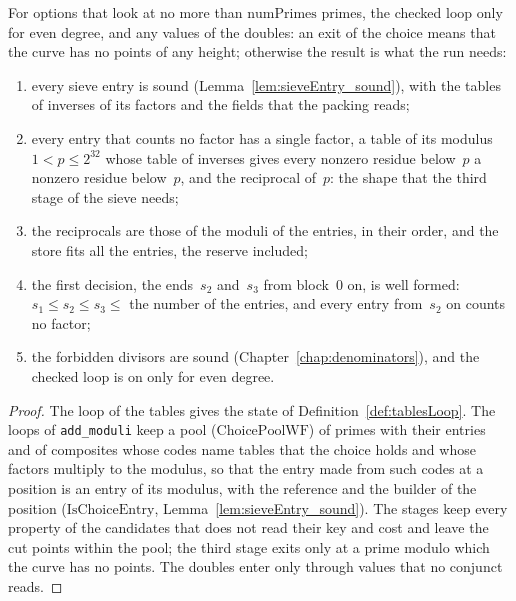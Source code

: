 \begin{lemma}\label{lem:choiceOfModuli}
  \leanok
  For options that look at no more than $\mathrm{numPrimes}$ primes, the checked loop only for even
  degree, and any values of the doubles: an exit of the choice means that the curve has no points
  of any height; otherwise the result is what the run needs:
  \begin{enumerate}
    \item every sieve entry is sound (Lemma~\ref{lem:sieveEntry_sound}), with the tables of
      inverses of its factors and the fields that the packing reads;
    \item every entry that counts no factor has a single factor, a table of its modulus
      $1 < p \le 2^{32}$ whose table of inverses gives every nonzero residue below~$p$ a nonzero
      residue below~$p$, and the reciprocal of~$p$: the shape that the third stage of the sieve
      needs;
    \item the reciprocals are those of the moduli of the entries, in their order, and the store
      fits all the entries, the reserve included;
    \item the first decision, the ends~$s_2$ and~$s_3$ from block~$0$ on, is well formed:
      $s_1 \le s_2 \le s_3 \le$ the number of the entries, and every entry from~$s_2$ on counts no
      factor;
    \item the forbidden divisors are sound (Chapter~\ref{chap:denominators}), and the checked loop
      is on only for even degree.
  \end{enumerate}
\end{lemma}

\begin{proof}
  \leanok
  The loop of the tables gives the state of Definition~\ref{def:tablesLoop}. The loops of
  \verb|add_moduli| keep a pool ($\mathrm{ChoicePoolWF}$) of primes with their entries and of
  composites whose codes name tables that the choice holds and whose factors multiply to the
  modulus, so that the entry made from such codes at a position is an entry of its modulus, with
  the reference and the builder of the position ($\mathrm{IsChoiceEntry}$,
  Lemma~\ref{lem:sieveEntry_sound}). The stages keep every property of the candidates that does
  not read their key and cost and leave the cut points within the pool; the third stage exits only
  at a prime modulo which the curve has no points. The doubles enter only through values that no
  conjunct reads.
\end{proof}

